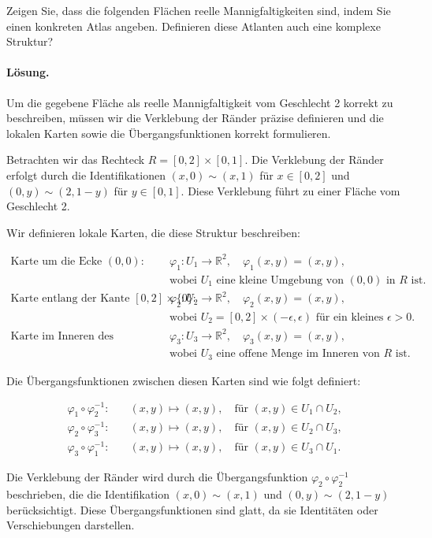 \documentclass[11pt,a4paper]{article}
\begin{document}
Zeigen Sie, dass die folgenden Flächen reelle Mannigfaltigkeiten sind, indem Sie einen konkreten Atlas angeben. Definieren diese Atlanten auch eine komplexe Struktur?

\paragraph{Lösung.}
Um die gegebene Fläche als reelle Mannigfaltigkeit vom Geschlecht 2 korrekt zu beschreiben, müssen wir die Verklebung der Ränder präzise definieren und die lokalen Karten sowie die Übergangsfunktionen korrekt formulieren.

Betrachten wir das Rechteck $R = [0, 2] \times [0, 1]$. Die Verklebung der Ränder erfolgt durch die Identifikationen $(x, 0) \sim (x, 1)$ für $x \in [0, 2]$ und $(0, y) \sim (2, 1-y)$ für $y \in [0, 1]$. Diese Verklebung führt zu einer Fläche vom Geschlecht 2.

Wir definieren lokale Karten, die diese Struktur beschreiben:

\begin{align*}
\text{Karte um die Ecke } (0,0): \quad & \varphi_1: U_1 \to \mathbb{R}^2, \quad \varphi_1(x,y) = (x,y), \\
& \text{wobei } U_1 \text{ eine kleine Umgebung von } (0,0) \text{ in } R \text{ ist.} \\
\text{Karte entlang der Kante } [0,2] \times \{0\}: \quad & \varphi_2: U_2 \to \mathbb{R}^2, \quad \varphi_2(x,y) = (x,y), \\
& \text{wobei } U_2 = [0,2] \times (-\epsilon, \epsilon) \text{ für ein kleines } \epsilon > 0. \\
\text{Karte im Inneren des Rechtecks:} \quad & \varphi_3: U_3 \to \mathbb{R}^2, \quad \varphi_3(x,y) = (x,y), \\
& \text{wobei } U_3 \text{ eine offene Menge im Inneren von } R \text{ ist.}
\end{align*}

Die Übergangsfunktionen zwischen diesen Karten sind wie folgt definiert:

\begin{align*}
\varphi_1 \circ \varphi_2^{-1}: \quad & (x,y) \mapsto (x,y), \quad \text{für } (x,y) \in U_1 \cap U_2, \\
\varphi_2 \circ \varphi_3^{-1}: \quad & (x,y) \mapsto (x,y), \quad \text{für } (x,y) \in U_2 \cap U_3, \\
\varphi_3 \circ \varphi_1^{-1}: \quad & (x,y) \mapsto (x,y), \quad \text{für } (x,y) \in U_3 \cap U_1.
\end{align*}

Die Verklebung der Ränder wird durch die Übergangsfunktion $\varphi_2 \circ \varphi_2^{-1}$ beschrieben, die die Identifikation $(x, 0) \sim (x, 1)$ und $(0, y) \sim (2, 1-y)$ berücksichtigt. Diese Übergangsfunktionen sind glatt, da sie Identitäten oder Verschiebungen darstellen.

\end{document}
